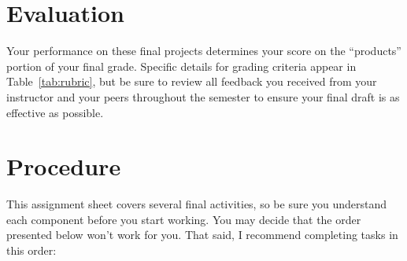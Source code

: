 \documentclass[11pt,oneside]{amsart}	%
\begin{document}
\section{Evaluation} %
\label{sec:evaluation}
Your performance on these final projects determines your score on the ``products'' portion of your final grade. Specific details for grading criteria appear in Table~\ref{tab:rubric}, but be sure to review all feedback you received from your instructor and your peers throughout the semester to ensure your final draft is as effective as possible.

\section{Procedure} %
	\label{sec:procedure}
This assignment sheet covers several final activities, so be sure you understand each component before you start working. You may decide that the order presented below won't work for you. That said, I recommend completing tasks in this order:
\end{document}
